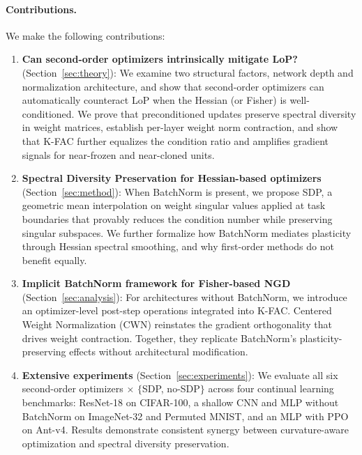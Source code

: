 \documentclass{article}
\begin{document}
\paragraph{Contributions.} We make the following contributions:
\begin{enumerate}[leftmargin=*,nosep]
    \item \textbf{Can second-order optimizers intrinsically mitigate LoP?}
    (Section~\ref{sec:theory}): We examine two structural factors, network depth and 
    normalization architecture, and show that second-order optimizers can automatically 
    counteract LoP when the Hessian (or Fisher) is well-conditioned. We prove that 
    preconditioned updates preserve spectral diversity in weight matrices, establish 
    per-layer weight norm contraction, and show that K-FAC further equalizes the condition 
    ratio and amplifies gradient signals for near-frozen and near-cloned units.

    \item \textbf{Spectral Diversity Preservation for Hessian-based optimizers}
    (Section~\ref{sec:method}): When BatchNorm is present, we propose SDP, a geometric 
    mean interpolation on weight singular values applied at task boundaries that provably 
    reduces the condition number while preserving singular subspaces. We further formalize 
    how BatchNorm mediates plasticity through Hessian spectral smoothing, and why 
    first-order methods do not benefit equally.

    \item \textbf{Implicit BatchNorm framework for Fisher-based NGD}
    (Section~\ref{sec:analysis}): For architectures without BatchNorm, we introduce an  
    optimizer-level post-step operations integrated into K-FAC. Centered Weight Normalization (CWN) reinstates the gradient 
    orthogonality that drives weight contraction. Together, they replicate 
    BatchNorm's plasticity-preserving effects without architectural modification.

    \item \textbf{Extensive experiments}
    (Section~\ref{sec:experiments}): We evaluate all six second-order optimizers 
    $\times$ $\{$SDP, no-SDP$\}$ across four continual learning benchmarks: ResNet-18 on 
    CIFAR-100, a shallow CNN and MLP without BatchNorm on ImageNet-32 and Permuted MNIST, 
    and an MLP with PPO on Ant-v4. Results demonstrate consistent synergy between 
    curvature-aware optimization and spectral diversity preservation.
\end{enumerate}
\end{document}
